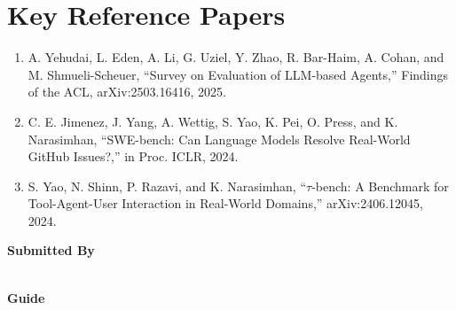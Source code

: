 \documentclass[11pt]{article}
\begin{document}
\section*{Key Reference Papers}
\begin{enumerate}
  \item A. Yehudai, L. Eden, A. Li, G. Uziel, Y. Zhao, R. Bar-Haim, A. Cohan, and M. Shmueli-Scheuer, ``Survey on Evaluation of LLM-based Agents,'' Findings of the ACL, arXiv:2503.16416, 2025.
  \item C. E. Jimenez, J. Yang, A. Wettig, S. Yao, K. Pei, O. Press, and K. Narasimhan, ``SWE-bench: Can Language Models Resolve Real-World GitHub Issues?,'' in Proc. ICLR, 2024.
  \item S. Yao, N. Shinn, P. Razavi, and K. Narasimhan, ``$\tau$-bench: A Benchmark for Tool-Agent-User Interaction in Real-World Domains,'' arXiv:2406.12045, 2024.
\end{enumerate}
\vspace{0.8em}
\noindent\textbf{Submitted By}\\
\seminarName\\
\seminarRoll

\vspace{0.6em}
\noindent\textbf{Guide}\\
\seminarGuide
\end{document}
